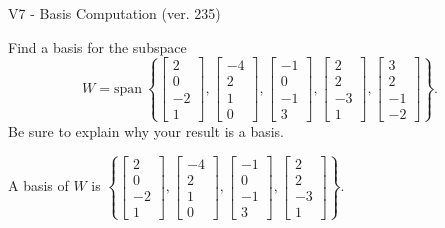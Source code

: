 \begin{exercise}
  \begin{exerciseTitle}V7 - Basis Computation (ver. 235)\end{exerciseTitle}
  \begin{exerciseStatement}
    Find a basis for the subspace 
\[W=\mathrm{span}\ \left\{\left[\begin{array}{r}
2 \\
0 \\
-2 \\
1
\end{array}\right] , \left[\begin{array}{r}
-4 \\
2 \\
1 \\
0
\end{array}\right] , \left[\begin{array}{r}
-1 \\
0 \\
-1 \\
3
\end{array}\right] , \left[\begin{array}{r}
2 \\
2 \\
-3 \\
1
\end{array}\right] , \left[\begin{array}{r}
3 \\
2 \\
-1 \\
-2
\end{array}\right]\right\}.\]
 Be sure to explain why your result is a basis.


  \end{exerciseStatement}
  \begin{exerciseAnswer}
   A basis of \(W\) is  \(\left\{\left[\begin{array}{r}
2 \\
0 \\
-2 \\
1
\end{array}\right] , \left[\begin{array}{r}
-4 \\
2 \\
1 \\
0
\end{array}\right] , \left[\begin{array}{r}
-1 \\
0 \\
-1 \\
3
\end{array}\right] , \left[\begin{array}{r}
2 \\
2 \\
-3 \\
1
\end{array}\right]\right\}\).
  


  \end{exerciseAnswer}
\end{exercise}